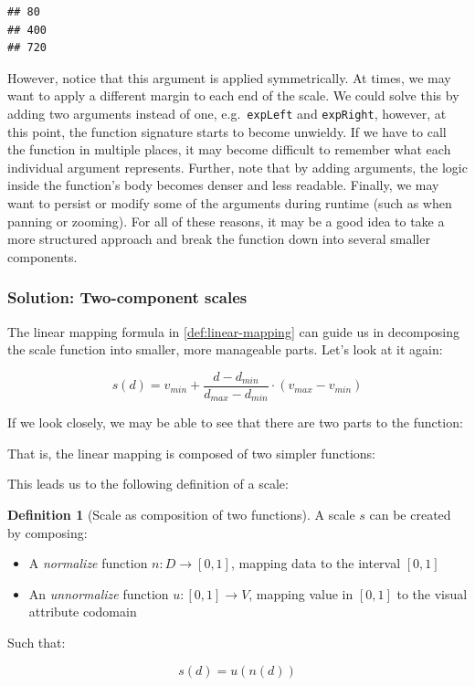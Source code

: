\documentclass[
]{book}
\providecommand{\tightlist}{%
  \setlength{\itemsep}{0pt}\setlength{\parskip}{0pt}}
\theoremstyle{definition}
\newtheorem{definition}{Definition}[chapter]
\theoremstyle{definition}
\theoremstyle{definition}
\theoremstyle{definition}
\theoremstyle{remark}
\begin{document}
\begin{verbatim}
## 80
## 400
## 720
\end{verbatim}

However, notice that this argument is applied symmetrically. At times, we may want to apply a different margin to each end of the scale. We could solve this by adding two arguments instead of one, e.g.~\texttt{expLeft} and \texttt{expRight}, however, at this point, the function signature starts to become unwieldy. If we have to call the function in multiple places, it may become difficult to remember what each individual argument represents. Further, note that by adding arguments, the logic inside the function's body becomes denser and less readable. Finally, we may want to persist or modify some of the arguments during runtime (such as when panning or zooming). For all of these reasons, it may be a good idea to take a more structured approach and break the function down into several smaller components.

\subsubsection{Solution: Two-component scales}\label{two-component-scales}

The linear mapping formula in \ref{def:linear-mapping} can guide us in decomposing the scale function into smaller, more manageable parts. Let's look at it again:

\[s(d) = v_{min} + \frac{d - d_{min}}{d_{max} - d_{min}} \cdot (v_{max} - v_{min})\]

If we look closely, we may be able to see that there are two parts to the function:

That is, the linear mapping is composed of two simpler functions:

This leads us to the following definition of a scale:

\begin{definition}[Scale as composition of two functions]
\protect\hypertarget{def:scale}{}\label{def:scale}A scale \(s\) can be created by composing:

\begin{itemize}
\tightlist
\item
  A \emph{normalize} function \(n: D \to [0, 1]\), mapping data to the interval \([0, 1]\)
\item
  An \emph{unnormalize} function \(u: [0, 1] \to V\), mapping value in \([0, 1]\) to the visual attribute codomain
\end{itemize}

Such that:

\[s(d) = u(n(d))\]
\end{definition}
\end{document}
